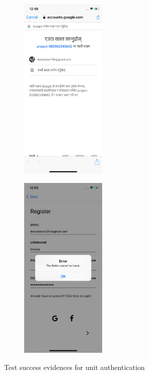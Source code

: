 \documentclass[12pt, a4paper, oneside]{article}
\begin{document}
\begin{figure}[H]
\begin{subfigure}{.5\textwidth}
    \centering
    \includegraphics[width=0.45\textwidth]{test-evidences/auth/e.png}
    \caption{}
\end{subfigure}%
\begin{subfigure}{.5\textwidth}
    \centering
    \includegraphics[width=0.45\textwidth]{test-evidences/auth/f.png}
    \caption{}
\end{subfigure}


\caption{Test success evidences for unit authentication}
\label{fig:test-evidence-auth}
\end{figure}
\end{document}
